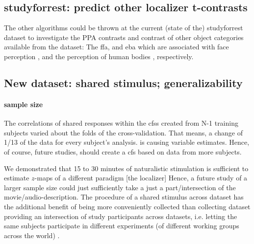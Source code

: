 \subsection{studyforrest: predict other localizer t-contrasts}


%
The other algorithms could be thrown at the current (state of the) studyforrest
dataset to investigate the PPA contrasts and contrast of other object categories
available from the dataset:
%
The \ac{ffa}, and \ac{eba}  which are associated with face perception
\citep{kanwisher1997ffa, pitcher2011occipitalfacearea}, and the perception of
human bodies \citep{downing2001bodyarea}, respectively.


\subsection{New dataset: shared stimulus; generalizability}

\paragraph{sample size}



The correlations of shared responses within the \acp{cfs} created from N-1
training subjects varied about the folds of the cross-validation.
That means, a change of 1/13 of the data for every subject's analysis.
is causing variable estimates.
Hence, of course, future studies, should create a \ac{cfs} based on data from
more subjects.


%
We demonstrated that 15 to 30 minutes of naturalistic stimulation is sufficient
to estimate $z$-maps of a different paradigm [the localizer]
%
Hence, a future study of a larger sample size could just sufficiently take a
just a part/intersection of the movie/audio-description.
%
The procedure of a shared stimulus across dataset has the additional benefit of
being more conveniently collected than collecting dataset providing an
intersection of study participants across datasets, i.e. letting the same
subjects participate in different experiments (of different working groups
across the world) \citep[(s.][ for an \ac{srm} based on "shared subjects acrpss
datasets]{zhang2018transfer}.


